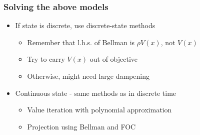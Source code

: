 \documentclass[bigger,handout]{beamer}
\begin{document}
\begin{frame}%
\frametitle{Solving the above models}

\begin{itemize}
\item If state is discrete, use discrete-state methods

\begin{itemize}
\item Remember that l.h.s. of Bellman is $\rho V(x)$, not $V\left( x\right) $

\item Try to carry $V(x)$ out of objective

\item Otherwise, might need large dampening
\end{itemize}

\item Continuous state - same methods as in discrete time

\begin{itemize}
\item Value iteration with polynomial approximation

\item Projection using Bellman and FOC
\end{itemize}
\end{itemize}

\end{frame}%
\end{document}
